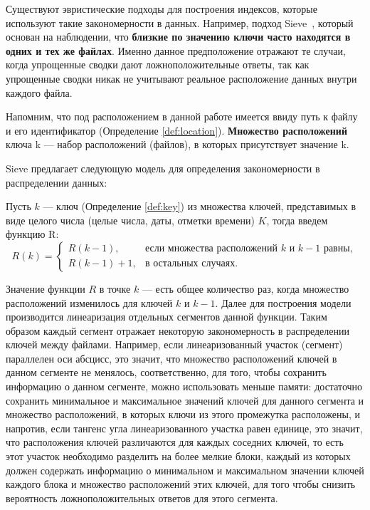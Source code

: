 Существуют эвристические подходы для построения индексов, которые используют такие закономерности в данных.
Например, подход Sieve~\cite{Sieve}, который основан на наблюдении, что \textbf{близкие по значению ключи часто находятся в одних и тех же файлах}. Именно данное предположение отражают те случаи, когда упрощенные сводки дают ложноположительные ответы, так как упрощенные сводки никак не учитывают реальное расположение данных внутри каждого файла.

Напомним, что под расположением в данной работе имеется ввиду путь к файлу и его идентификатор (Определение \ref{def:location}). \textbf{Множество расположений} ключа k --- набор расположений (файлов), в которых присутствует значение k.

Sieve предлагает следующую модель для определения закономерности в распределении данных:

Пусть $k$ --- ключ (Определение \ref{def:key}) из множества ключей, представимых в виде целого числа (целые числа, даты, отметки времени) $K$, тогда введем функцию R:
\begin{equation}\label{R_CDF}
R(k) = 
\begin{cases} 
    R(k - 1), & \text{если множества расположений $k$ и $k - 1$ равны}, \\
    R(k - 1) + 1, & \text{в остальных случаях}.
\end{cases}
\end{equation}

Значение функции $R$ в точке $k$ --- есть общее количество раз, когда множество расположений изменилось для ключей $k$ и $k - 1$.
Далее для построения модели производится линеаризация отдельных сегментов данной функции.
Таким образом каждый сегмент отражает некоторую закономерность в распределении ключей между файлами.
Например, если линеаризованный участок (сегмент) параллелен оси абсцисс, это значит, что множество расположений ключей в данном сегменте не менялось, соответственно, для того, чтобы сохранить информацию о данном сегменте, можно использовать меньше памяти: достаточно сохранить минимальное и максимальное значений ключей для данного сегмента и множество расположений, в которых ключи из этого промежутка расположены, и напротив, если тангенс угла линеаризованного участка равен единице, это значит, что расположения ключей различаются для каждых соседних ключей, то есть этот участок необходимо разделить на более мелкие блоки, каждый из которых должен содержать информацию о минимальном и максимальном значении ключей каждого блока и множество расположений этих ключей, для того чтобы снизить вероятность ложноположительных ответов для этого сегмента.


